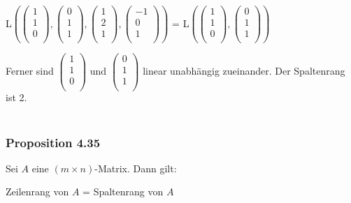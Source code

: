 \documentclass{article}
\begin{document}
\begin{center}
    L$\left( \begin{pmatrix}
        1 \\
        1 \\
        0 \\
    \end{pmatrix}, \begin{pmatrix}
        0 \\
        1 \\
        1 \\
    \end{pmatrix}, \begin{pmatrix}
        1 \\
        2 \\
        1 \\
    \end{pmatrix}, \begin{pmatrix}
        -1 \\
        0 \\
        1 \\
    \end{pmatrix} \right)$ = L$\left( \begin{pmatrix}
        1 \\
        1 \\
        0 \\
    \end{pmatrix}, \begin{pmatrix}
        0 \\
        1 \\
        1 \\
    \end{pmatrix} \right)$ \\
\end{center}
Ferner sind $\begin{pmatrix}
    1 \\
    1 \\
    0 \\
\end{pmatrix}$ und $\begin{pmatrix}
    0 \\
    1 \\
    1 \\
\end{pmatrix}$ linear unabhängig zueinander. Der Spaltenrang ist 2. \\
\\
\subsubsection*{Proposition 4.35}
Sei $A$ eine $(m \times n)$-Matrix. Dann gilt: \\
\begin{center}
    Zeilenrang von $A$ = Spaltenrang von $A$ \\
\end{center}
\end{document}
